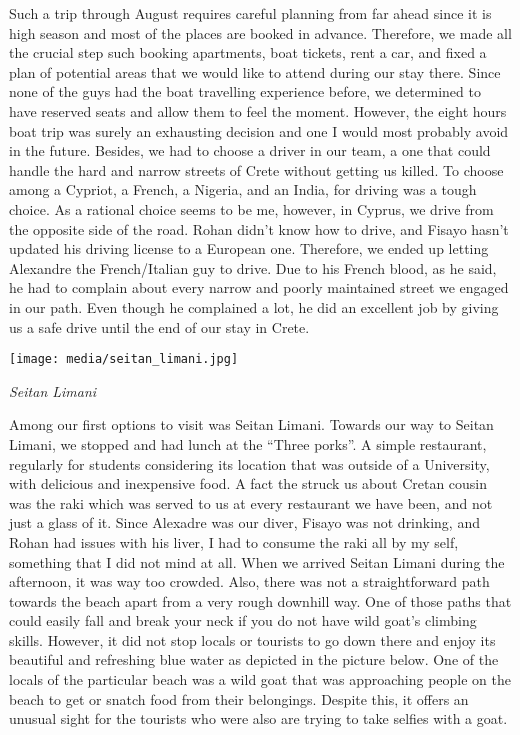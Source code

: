 \documentclass[10pt,a4paper]{article} %
\begin{document}
\begin{multicols}{3}
Such a trip through August requires careful planning from far ahead
since it is high season and most of the places are booked in advance. 
Therefore, we made all the crucial step such booking apartments,
boat tickets, rent a car, and fixed a plan of potential areas that
we would like to attend during our stay there. 
Since none of the guys had the boat travelling experience before,
we determined to have reserved seats and allow them to feel the moment. 
However, the eight hours boat trip was surely an exhausting decision
and one I would most probably avoid in the future.  
Besides, we had to choose a driver in our team,
a one that could handle the hard and narrow streets of Crete
without getting us killed. 
To choose among a Cypriot, a French, a Nigeria, and an India,
for driving was a tough choice. 
As a rational choice seems to be me, however, in Cyprus,
we drive from the opposite side of the road. 
Rohan didn't know how to drive, and Fisayo hasn't updated his driving license
to a European one. 
Therefore, we ended up letting Alexandre the French/Italian guy to drive. 
Due to his French blood, as he said, he had to complain about every narrow 
and poorly maintained street we engaged in our path. 
Even though he complained a lot,
he did an excellent job by giving us a safe drive
until the end of our stay in Crete. 

\begin{center}
	\texttt{[image: media/seitan\_limani.jpg]}
	\par\textit{Seitan Limani}
\end{center}

Among our first options to visit was Seitan Limani. 
Towards our way to Seitan Limani, we stopped and had lunch at the 
``Three porks''. 
A simple restaurant, regularly for students considering its location
that was outside of a University, with delicious and inexpensive food. 
A fact the struck us about Cretan cousin was the raki
which was served to us at every restaurant we have been,
and not just a glass of it. 
Since Alexadre was our diver, Fisayo was not drinking,
and Rohan had issues with his liver, I had to consume the raki all by my self,
something that I did not mind at all. 
When we arrived Seitan Limani during the afternoon, it was way too crowded. 
Also, there was not a straightforward path towards the beach
apart from a very rough downhill way. 
One of those paths that could easily fall and break your neck
if you do not have wild goat's climbing skills. 
However, it did not stop locals or tourists to go down there
and enjoy its beautiful and refreshing blue water as depicted in the picture below. 
One of the locals of the particular beach was a wild goat
that was approaching people on the beach to get or snatch food from their belongings. 
Despite this, it offers an unusual sight for the tourists
who were also are trying to take selfies with a goat.   


\end{multicols}
\end{document}
